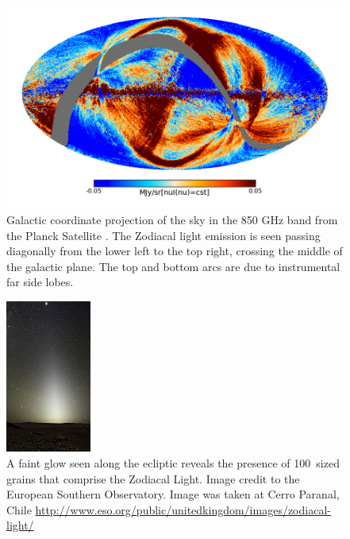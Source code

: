     
    
    \begin{figure}
    \centering
    \includegraphics[width=.8\textwidth]{Ch1/zodiacal_planck} 
    \caption[Zodiacal Light Emission From Planck]{Galactic coordinate projection of the sky in the 850 GHz band from the Planck Satellite \citep{Ade2014}. The Zodiacal light emission is seen passing diagonally from the lower left to the top right, crossing the middle of the galactic plane. The top and bottom arcs are due to instrumental far side lobes.}
    \label{fig:ZD_Planck}
    \end{figure}
    
    
    
    
    \begin{figure}
    \centering
    \includegraphics[width=0.25\textwidth]{Ch1/Zodiacal_Light_Paranal} 
    \caption[Zodiacal Light On Earth]{A faint glow seen along the ecliptic reveals the presence of 100\micron\  sized grains that comprise the Zodiacal Light. Image credit to the European Southern Observatory. Image was taken at Cerro Paranal, Chile \url{http://www.eso.org/public/unitedkingdom/images/zodiacal-light/}}
    \label{fig:ZD_ESO}
    \end{figure}
    
